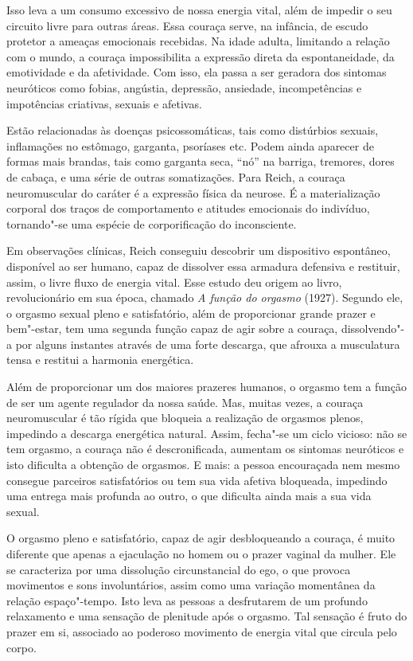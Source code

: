 Isso leva a um consumo excessivo de nossa energia vital, além de impedir
o seu circuito livre para outras áreas. Essa couraça serve, na infância,
de escudo protetor a ameaças emocionais recebidas. Na idade adulta,
limitando a relação com o mundo, a couraça impossibilita a expressão
direta da espontaneidade, da emotividade e da afetividade. Com isso, ela
passa a ser geradora dos sintomas neuróticos como fobias, angústia,
depressão, ansiedade, incompetências e impotências criativas, sexuais e
afetivas.

Estão relacionadas às doenças psicossomáticas, tais como distúrbios
sexuais, inflamações no estômago, garganta, psoríases etc. Podem ainda
aparecer de formas mais brandas, tais como garganta seca, ``nó'' na
barriga, tremores, dores de cabaça, e uma série de outras somatizações.
Para Reich, a couraça neuromuscular do caráter é a expressão física da
neurose. É a materialização corporal dos traços de comportamento e
atitudes emocionais do indivíduo, tornando"-se uma espécie de
corporificação do inconsciente.

Em observações clínicas, Reich conseguiu descobrir um dispositivo
espontâneo, disponível ao ser humano, capaz de dissolver essa armadura
defensiva e restituir, assim, o livre fluxo de energia vital. Esse
estudo deu origem ao livro, revolucionário em sua época, chamado
\emph{A função do orgasmo} (1927). Segundo ele, o orgasmo sexual pleno e
satisfatório, além de proporcionar grande prazer e bem"-estar, tem uma
segunda função capaz de agir sobre a couraça, dissolvendo"-a por alguns
instantes através de uma forte descarga, que afrouxa a musculatura tensa
e restitui a harmonia energética.

Além de proporcionar um dos maiores prazeres humanos, o orgasmo tem a
função de ser um agente regulador da nossa saúde. Mas, muitas vezes, a
couraça neuromuscular é tão rígida que bloqueia a realização de orgasmos
plenos, impedindo a descarga energética natural. Assim, fecha"-se um
ciclo vicioso: não se tem orgasmo, a couraça não é descronificada,
aumentam os sintomas neuróticos e isto dificulta a obtenção de orgasmos.
E mais: a pessoa encouraçada nem mesmo consegue parceiros satisfatórios
ou tem sua vida afetiva bloqueada, impedindo uma entrega mais profunda
ao outro, o que dificulta ainda mais a sua vida sexual.

O orgasmo pleno e satisfatório, capaz de agir desbloqueando a couraça, é
muito diferente que apenas a ejaculação no homem ou o prazer vaginal da
mulher. Ele se caracteriza por uma dissolução circunstancial do ego, o
que provoca movimentos e sons involuntários, assim como uma variação
momentânea da relação espaço"-tempo. Isto leva as pessoas a desfrutarem
de um profundo relaxamento e uma sensação de plenitude após o orgasmo.
Tal sensação é fruto do prazer em si, associado ao poderoso movimento %
de energia vital que circula pelo corpo.

